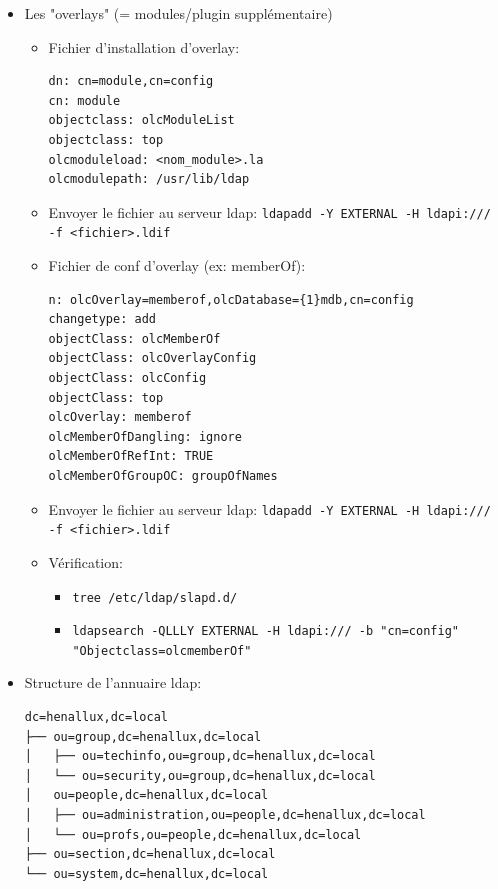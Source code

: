 \documentclass[a4paper]{article}
\begin{document}
\begin{itemize}
\item Les "overlays" (= modules/plugin supplémentaire)
\begin{example} \begin{itemize}
    \item Fichier d'installation d'overlay:
\begin{example} \begin{verbatim}
dn: cn=module,cn=config
cn: module
objectclass: olcModuleList
objectclass: top
olcmoduleload: <nom_module>.la
olcmodulepath: /usr/lib/ldap
\end{verbatim} \end{example}
    \item Envoyer le fichier au serveur ldap: \texttt{ldapadd -Y EXTERNAL -H ldapi:/// -f <fichier>.ldif}
    \item Fichier de conf d'overlay (ex: memberOf):
\begin{example} \begin{verbatim}
n: olcOverlay=memberof,olcDatabase={1}mdb,cn=config
changetype: add
objectClass: olcMemberOf
objectClass: olcOverlayConfig
objectClass: olcConfig
objectClass: top
olcOverlay: memberof
olcMemberOfDangling: ignore
olcMemberOfRefInt: TRUE
olcMemberOfGroupOC: groupOfNames
\end{verbatim} \end{example}
    \item Envoyer le fichier au serveur ldap: \texttt{ldapadd -Y EXTERNAL -H ldapi:/// -f <fichier>.ldif}
    \item Vérification:
\begin{example} \begin{itemize}
    \item \texttt{tree /etc/ldap/slapd.d/}
    \item \texttt{ldapsearch -QLLLY EXTERNAL -H ldapi:/// -b "cn=config" "Objectclass=olcmemberOf"}
\end{itemize} \end{example}
\end{itemize} \end{example}


\item Structure de l'annuaire ldap:
\begin{example} \begin{verbatim}
dc=henallux,dc=local
├── ou=group,dc=henallux,dc=local
│   ├── ou=techinfo,ou=group,dc=henallux,dc=local
│   └── ou=security,ou=group,dc=henallux,dc=local
│   ou=people,dc=henallux,dc=local
│   ├── ou=administration,ou=people,dc=henallux,dc=local
│   └── ou=profs,ou=people,dc=henallux,dc=local
├── ou=section,dc=henallux,dc=local
└── ou=system,dc=henallux,dc=local
\end{verbatim} \end{example}



\end{itemize}
\end{document}
